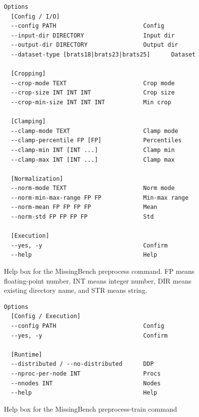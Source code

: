 \documentclass{article}
\begin{document}
\begin{figure}[h]
\centering
\begin{tcolorbox}[
  colback=lightgreenbg,
  colframe=lightgreenframe,
  arc=2mm,
  boxrule=0.6pt,
  title=MissingBench preprocess,
  fonttitle=\bfseries
]
\begin{Verbatim}[breaklines=true,breakanywhere=true,fontsize=\small]
Options
  [Config / I/O]
  --config PATH                         Config
  --input-dir DIRECTORY                 Input dir
  --output-dir DIRECTORY                Output dir
  --dataset-type [brats18|brats23|brats25]      Dataset

  [Cropping]
  --crop-mode TEXT                      Crop mode
  --crop-size INT INT INT               Crop size
  --crop-min-size INT INT INT           Min crop

  [Clamping]
  --clamp-mode TEXT                     Clamp mode
  --clamp-percentile FP [FP]            Percentiles
  --clamp-min INT [INT ...]             Clamp min
  --clamp-max INT [INT ...]             Clamp max

  [Normalization]
  --norm-mode TEXT                      Norm mode
  --norm-min-max-range FP FP            Min-max range
  --norm-mean FP FP FP FP               Mean
  --norm-std FP FP FP FP                Std

  [Execution]
  --yes, -y                             Confirm
  --help                                Help
\end{Verbatim}
\end{tcolorbox}
\caption{Help box for the MissingBench preprocess command. FP means floating-point number, INT means integer number, DIR means existing directory name, and STR means string.}
\label{fig:missingbench_preprocess}
\end{figure}

\begin{figure}[h]
\centering
\begin{tcolorbox}[
  colback=lightgreenbg,
  colframe=lightgreenframe,
  arc=2mm,
  boxrule=0.6pt,
  title=MissingBench preprocess-train,
  fonttitle=\bfseries
]
\begin{Verbatim}[breaklines=true,breakanywhere=true,fontsize=\small]
Options
  [Config / Execution]
  --config PATH                         Config
  --yes, -y                             Confirm

  [Runtime]
  --distributed / --no-distributed      DDP
  --nproc-per-node INT                  Procs
  --nnodes INT                          Nodes
  --help                                Help
\end{Verbatim}
\end{tcolorbox}
\caption{Help box for the MissingBench preprocess-train command}
\label{fig:missingbench_preprocess_train}
\end{figure}
\end{document}
